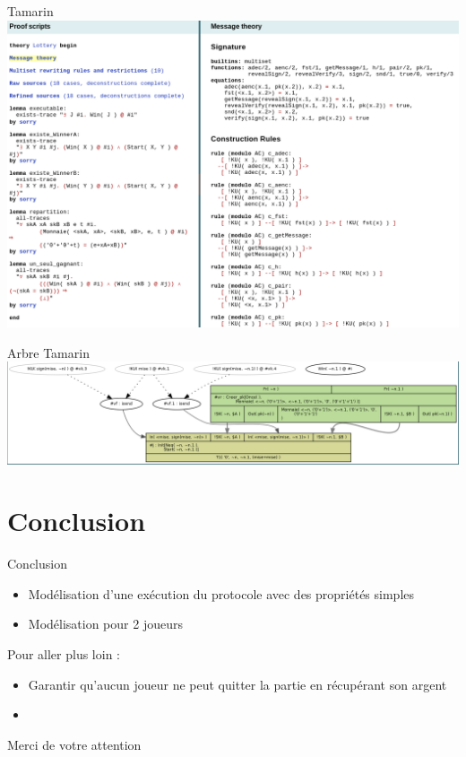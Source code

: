 \documentclass[french]{beamer}
\begin{document}
\begin{frame}{Tamarin}
\centering
\includegraphics[scale=0.20]{Tamarin1erePage.png}\\
\end{frame}

\begin{frame}{Arbre Tamarin}
\centering
\includegraphics[scale=0.25]{ArbreIntermediaire.png}\\
\end{frame}

\section{Conclusion}
\begin{frame}{Conclusion}
\begin{itemize}
    \item Modélisation d'une exécution du protocole avec des propriétés simples
    \item Modélisation pour 2 joueurs
\end{itemize}
Pour aller plus loin : \\
\begin{itemize}
    \item Garantir qu'aucun joueur ne peut quitter la partie en récupérant son argent
    \item 
\end{itemize}
\end{frame}

\begin{frame}
\Huge Merci de votre attention
\end{frame}
\end{document}
